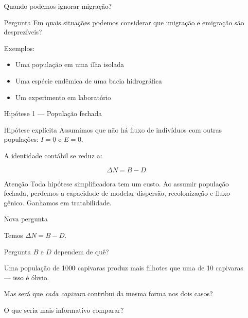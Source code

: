 \documentclass[12pt]{beamer}
\begin{document}
\begin{frame}{Quando podemos ignorar migração?}

  \begin{alertblock}{Pergunta}
    Em quais situações podemos considerar que
    imigração e emigração são desprezíveis?
  \end{alertblock}

  \bigskip
  Exemplos:
  \begin{itemize}
    \item Uma população em uma ilha isolada
    \item Uma espécie endêmica de uma bacia hidrográfica
    \item Um experimento em laboratório
  \end{itemize}

\end{frame}

\begin{frame}{Hipótese 1 — População fechada}

  \begin{exampleblock}{Hipótese explícita}
    Assumimos que não há fluxo de indivíduos com outras populações:
    $I = 0$ e $E = 0$.
  \end{exampleblock}

  \bigskip
  A identidade contábil se reduz a:

  \[
    \Delta N = B - D
  \]

  \bigskip
  \begin{block}{Atenção}
    Toda hipótese simplificadora tem um custo.
    Ao assumir população fechada, perdemos a capacidade
    de modelar dispersão, recolonização e fluxo gênico.
    Ganhamos em tratabilidade.
  \end{block}

\end{frame}

\begin{frame}{Nova pergunta}

  Temos $\Delta N = B - D$.

  \bigskip
  \begin{alertblock}{Pergunta}
    $B$ e $D$ dependem de quê?
  \end{alertblock}

  \bigskip
  Uma população de 1000 capivaras produz mais filhotes
  que uma de 10 capivaras --- isso é óbvio.

  \bigskip
  Mas será que \emph{cada capivara} contribui da mesma forma
  nos dois casos?

  \bigskip
  O que seria mais informativo comparar?

\end{frame}
\end{document}
